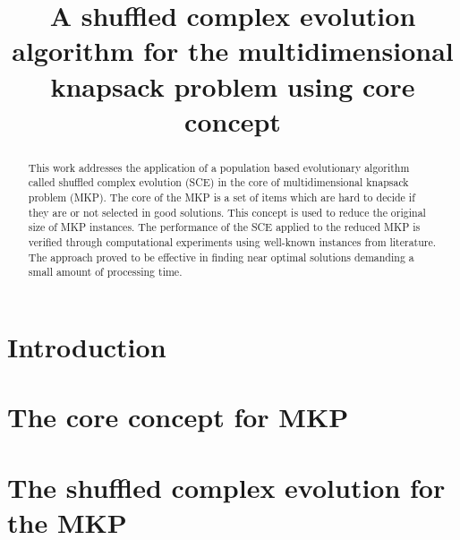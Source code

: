 \documentclass[10pt, conference, compsocconf]{IEEEtran}
\begin{document}
\title{ 
A shuffled complex evolution algorithm for
the multidimensional knapsack problem using core concept}

\author{
\and
{}
}

\maketitle

\begin{abstract}
This work addresses the application of a population based evolutionary algorithm
called shuffled complex evolution (SCE) in the core of multidimensional knapsack
problem (MKP).
The core of the MKP is a set of items which are hard to decide if they are or
not selected in good solutions.
This concept is used to reduce the original size of MKP instances.
The performance of the SCE applied to the reduced MKP is verified through computational experiments
using well-known instances from literature.
The approach proved to be effective in finding near optimal solutions
demanding a small amount of processing time.
\end{abstract}
\IEEEpeerreviewmaketitle

\section{Introduction}
\label{sec:intro}


\section{The core concept for MKP}
\vspace*{-5pt}      %
\label{sec:core}


\section{The shuffled complex evolution for the MKP}
\label{sec:sce}

\end{document}
